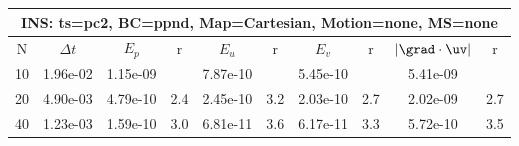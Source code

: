 
\begin{tabular}{|c|c|c|c|c|c|c|c|c|c|} \hline
 \multicolumn{10}{|c|}{INS: ts=pc2, BC=ppnd, Map=Cartesian, Motion=none, MS=none } \\ \hline 
     N  &   $\Delta t$ & $E_p$   &  r  &   $E_u$   &   r    &   $E_v$   & r   &  $|\grad\cdot\uv|$  & r   \\ \hline 
  10   &  1.96e-02  &   1.15e-09  &        &   7.87e-10  &        &   5.45e-10  &        &   5.41e-09  &        \\ 
  20   &  4.90e-03  &   4.79e-10  & 2.4  &   2.45e-10  & 3.2  &   2.03e-10  & 2.7  &   2.02e-09  & 2.7  \\ 
  40   &  1.23e-03  &   1.59e-10  & 3.0  &   6.81e-11  & 3.6  &   6.17e-11  & 3.3  &   5.72e-10  & 3.5  \\ 
 \hline 
\end{tabular}
